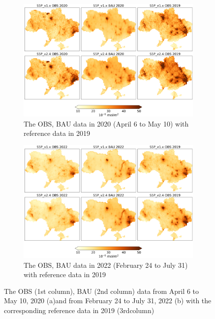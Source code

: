 \begin{figure}[pt]
    \centering
    \begin{subfigure}{\textwidth}
      \centering
      \includegraphics[width=\textwidth]{figs/chap3/figA3_a.png}
      \caption[Examples of OBS and BAU data in 2020]{The OBS, BAU data in 2020 (April 6 to May 10) with reference data in 2019}
    \end{subfigure}

    \begin{subfigure}{\textwidth}
      \centering
      \includegraphics[width=\textwidth]{figs/chap3/figA3_b.png}
      \caption{The OBS, BAU data in 2022 (February 24 to July 31) with reference data in 2019}
    \end{subfigure}
    \caption[Examples of OBS and BAU data in 2022]{The OBS (1st column), BAU (2nd column) data from April 6 to May 10, 2020 (a)and from February 24 to July 31, 2022 (b) with the corresponding reference data in 2019 (3rdcolumn)}
    \label{fig:chap3_figa3}
\end{figure}

